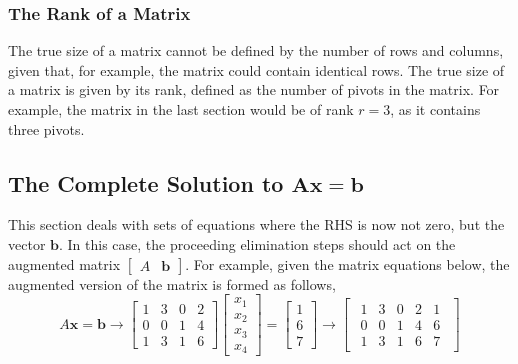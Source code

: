         \subsubsection{The Rank of a Matrix}
            The true size of a matrix cannot be defined by the number of rows and columns, given that, for example, the 
            matrix could contain identical rows. The true size of a matrix is given by its rank, defined as the number 
            of pivots in the matrix. For example, the matrix in the last section would be of rank \(r = 3\), as it 
            contains three pivots. 

    \subsection{The Complete Solution to \(\boldsymbol{Ax=b}\)}
        This section deals with sets of equations where the RHS is now not zero, but the vector \(\boldsymbol{b}\). In 
        this case, the proceeding elimination steps should act on the augmented matrix \(\begin{bmatrix} A & 
        \boldsymbol{b}\end{bmatrix}\). For example, given the matrix equations below, the augmented version of the matrix 
        is formed as follows,
        \begin{equation}
            A\boldsymbol{x} = \boldsymbol{b} \rightarrow
            \begin{bmatrix}
                1 & 3 & 0 & 2 \\
                0 & 0 & 1 & 4 \\
                1 & 3 & 1 & 6
            \end{bmatrix}
            \begin{bmatrix}
                x_1 \\ x_2 \\ x_3 \\ x_4
            \end{bmatrix}
            =
            \begin{bmatrix}
                1 \\ 6 \\ 7
            \end{bmatrix}
            \rightarrow
            \begin{bmatrix}
                \begin{array}{cccc|c}
                    1 & 3 & 0 & 2 & 1 \\
                    0 & 0 & 1 & 4 & 6 \\
                    1 & 3 & 1 & 6 & 7
                \end{array}
            \end{bmatrix}
        \end{equation}
